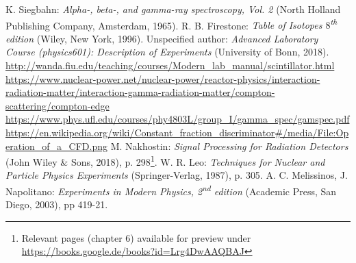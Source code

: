 \documentclass[twocolumn]{article}
\begin{document}
\clearpage
\begin{thebibliography}{9}

K. Siegbahn: \textsl{Alpha-, beta-, and gamma-ray spectroscopy, Vol. 2} (North Holland Publishing Company, Amsterdam, 1965).
R. B. Firestone: \textsl{Table of Isotopes $8$\textsuperscript{th} edition} (Wiley, New York, 1996).
Unspecified author: \textsl{Advanced Laboratory Course (physics601): Description of Experiments} (University of Bonn, 2018).
 \url{http://wanda.fiu.edu/teaching/courses/Modern_lab_manual/scintillator.html}
\url{https://www.nuclear-power.net/nuclear-power/reactor-physics/interaction-radiation-matter/interaction-gamma-radiation-matter/compton-scattering/compton-edge}
\url{https://www.phys.ufl.edu/courses/phy4803L/group_I/gamma_spec/gamspec.pdf}
\url{https://en.wikipedia.org/wiki/Constant_fraction_discriminator#/media/File:Operation_of_a_CFD.png}
M. Nakhostin: \textsl{Signal Processing for Radiation Detectors} (John Wiley $\&$ Sons, 2018), p. 298\footnote{Relevant pages (chapter 6) available for preview under\\ \url{https://books.google.de/books?id=Lrg4DwAAQBAJ}}.
W. R. Leo: \textsl{Techniques for Nuclear and Particle Physics Experiments} (Springer-Verlag, 1987), p. 305.
A. C. Melissinos, J. Napolitano: \textsl{Experiments in Modern Physics, 2\textsuperscript{nd} edition} (Academic Press, San Diego, 2003), pp 419-21.
\end{thebibliography}
\end{document}
